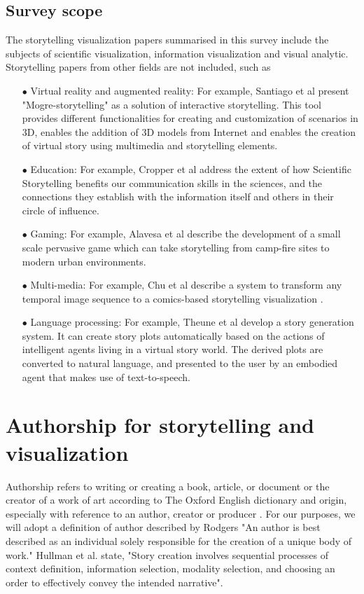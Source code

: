 \documentclass{egpubl}
\begin{document}
\subsection{Survey scope}
The storytelling visualization papers summarised in this survey include the subjects of scientific visualization, information visualization and visual analytic. Storytelling papers from other fields are not included, such as
\begin{enumerate}
\item[$\bullet$] Virtual reality and augmented reality: For example, Santiago et al \cite{santiago2014mogre} present "Mogre-storytelling" as a solution of interactive storytelling. This tool provides different functionalities for creating and customization of scenarios in 3D, enables the addition of 3D models from Internet and enables the creation of virtual story using multimedia and storytelling elements.
\item[$\bullet$] Education:  For example, Cropper et al \cite{cropper2015scientific} address the extent of how Scientific Storytelling benefits our communication skills in the sciences, and the connections they establish with the information itself and others in their circle of influence.
\item[$\bullet$] Gaming:  For example, Alavesa et al\cite{alavesa2013combining} describe the development of a small scale pervasive game which can take storytelling from camp-fire sites to modern urban environments. 
\item[$\bullet$] Multi-media: For example, Chu et al describe a system to transform any temporal image sequence to a comics-based storytelling visualization \cite{chu2015}. 
\item[$\bullet$] Language processing: For example, Theune et al \cite{theune2006generating} develop a story generation system. It can create story plots automatically based on the actions of intelligent agents living in a virtual story world. The derived plots are converted to natural language, and presented to the user by an embodied agent that makes use of text-to-speech.
\end{enumerate}
\section{Authorship for storytelling and visualization}
Authorship refers to writing or creating a book, article, or document or the creator of a work of art according to The Oxford English dictionary\cite{authoship2} and origin, especially with reference to an author, creator or producer \cite{authoship1}. For our purposes, we will adopt a definition of author described by Rodgers\cite{rodgers2011} "An author is best described as an individual solely responsible for the creation of a unique body of work."  Hullman \cite{hullman2013deeper} et al. state, "Story creation involves sequential processes of context definition, information selection, modality selection, and choosing an order to effectively convey the intended narrative".
\end{document}
